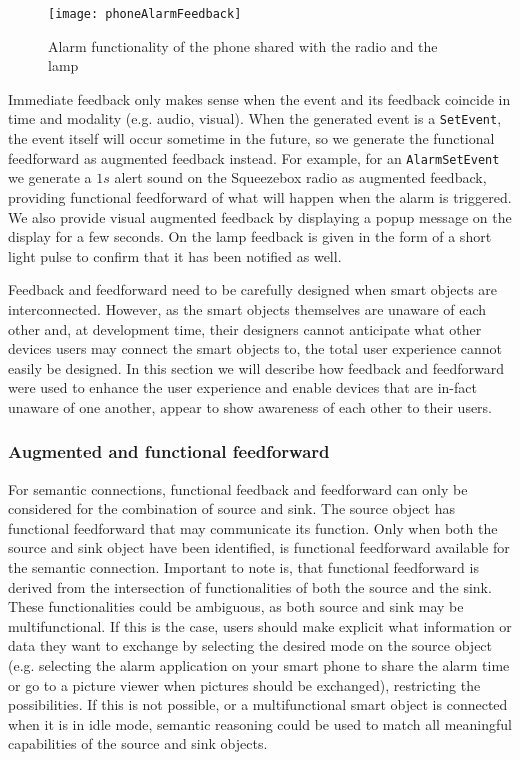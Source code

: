 \begin{figure}
\centering
\texttt{[image: phoneAlarmFeedback]}
\caption{Alarm functionality of the phone shared with the radio and the lamp}
\label{phoneAlarmFeedback}
\end{figure}

Immediate feedback only makes sense when the event and its feedback coincide in time and modality (e.g. audio, visual). When the generated event is a \texttt{SetEvent}, the event itself will occur sometime in the future, so we generate the functional feedforward as augmented feedback instead. For example, for an \texttt{AlarmSetEvent} we generate a $1s$ alert sound on the Squeezebox radio as augmented feedback, providing functional feedforward of what will happen when the alarm is triggered. We also provide visual augmented feedback by displaying a popup message on the display for a few seconds. On the lamp feedback is given in the form of a short light pulse to confirm that it has been notified as well.

Feedback and feedforward need to be carefully designed when smart objects are interconnected. However, as the smart objects themselves are unaware of each other and, at development time, their designers cannot anticipate what other devices users may connect the smart objects to, the total user experience cannot easily be designed.  In this section we will describe how feedback and feedforward were used to enhance the user experience and enable devices that are in-fact unaware of one another, appear to show awareness of each other to their users. 

\subsubsection{Augmented and functional feedforward}
\label{section:augmentedFunctionalFf}
For semantic connections, functional feedback and feedforward can only be considered for the combination of source and sink. The source object has functional feedforward that may communicate its function. Only when both the source and sink object have been identified, is functional feedforward available for the semantic connection. Important to note is, that  functional feedforward is derived from the intersection of functionalities of both the source and the sink. These functionalities could be ambiguous, as both source and sink may be multifunctional. If this is the case, users should make explicit what information or data they want to exchange by selecting the desired mode on the source object (e.g. selecting the alarm application on your smart phone to share the alarm time or go to a picture viewer when pictures should be exchanged), restricting the possibilities. If this is not possible, or a multifunctional smart object is connected when it is in idle mode, semantic reasoning could be used to match all meaningful capabilities of the source and sink objects.

